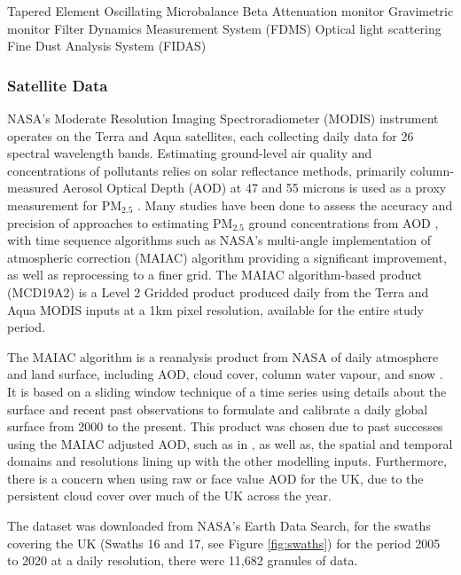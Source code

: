 
Tapered Element Oscillating Microbalance
Beta Attenuation monitor
Gravimetric monitor
Filter Dynamics Measurement System (FDMS)
Optical light scattering
Fine Dust Analysis System (FIDAS)



\subsubsection{Satellite Data}
NASA's Moderate Resolution Imaging Spectroradiometer (MODIS) instrument operates on the Terra and Aqua satellites, each collecting daily data for 26 spectral wavelength bands. Estimating ground-level air quality and concentrations of pollutants relies on solar reflectance methods, primarily column-measured Aerosol Optical Depth (AOD) at 47 and 55 microns is used as a proxy measurement for PM$_{2.5}$ \citep{Christopher2010SatelliteProblem}. Many studies have been done to assess the accuracy and precision of approaches to estimating PM$_{2.5}$ ground concentrations from AOD \citep{Zhang2021SatellitePerspectives}, with time sequence algorithms such as NASA's multi-angle implementation of atmospheric correction (MAIAC) algorithm providing a significant improvement, as well as reprocessing to a finer grid. The MAIAC algorithm-based product (MCD19A2) is a Level 2 Gridded product produced daily from the Terra and Aqua MODIS inputs at a 1km pixel resolution, available for the entire study period.

The MAIAC algorithm is a reanalysis product from NASA of daily atmosphere and land surface, including AOD, cloud cover, column water vapour, and snow \citep{NASAMulti-AngleMCD19}. It is based on a sliding window technique of a time series using details about the surface and recent past observations to formulate and calibrate a daily global surface from 2000 to the present. This product was chosen due to past successes using the MAIAC adjusted AOD, such as in \cite{He2021TheAOD}, as well as, the spatial and temporal domains and resolutions lining up with the other modelling inputs. Furthermore, there is a concern when using raw or face value AOD for the UK, due to the persistent cloud cover over much of the UK across the year. 

The dataset was downloaded from NASA's Earth Data Search, for the swaths covering the UK (Swaths 16 and 17, see Figure \ref{fig:swaths}) for the period 2005 to 2020 at a daily resolution, there were 11,682 granules of data. 

